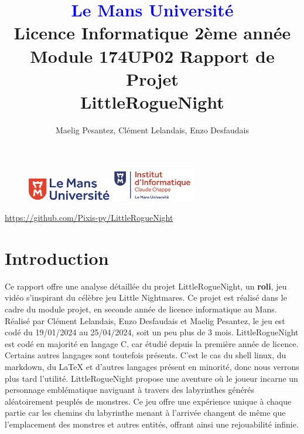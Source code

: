 \documentclass[10pt]{article}
\begin{document}
\begin{figure}
\includegraphics[width=3.7cm]{logolemansU.png}
\hspace{160pt}
\includegraphics[width=3.7cm]{logo_IC2.png}
\end{figure}

\title{\textbf{\textcolor{blue}{Le Mans Université}}\\Licence Informatique 2ème année\\Module 174UP02 Rapport de Projet\\\textbf{LittleRogueNight}}
\author{Maelig Pesantez, Clément Lelandais, Enzo Desfaudais}
\maketitle
\hspace{65pt}
\hyperlink{Github}{https://github.com/Pixis-py/LittleRogueNight}

\newpage
\tableofcontents

\newpage

\section{Introduction}
Ce rapport offre une analyse détaillée du projet LittleRogueNight, un \textbf{\gls{roli}}, jeu vidéo s'inspirant du célèbre jeu Little Nightmares. 
Ce projet est réalisé dans le cadre du module projet, en seconde année de licence informatique au Mans. Réalisé par Clément Lelandais, Enzo Desfaudais et Maelig Pesantez, le jeu est codé du 19/01/2024 au 25/04/2024, soit un peu plus de 3 mois.
LittleRogueNight est codé en majorité en langage C, car étudié depuis la première année de licence. Certains autres langages sont toutefois présents.
C'est le cas du shell linux, du markdown, du LaTeX et d'autres langages présent en minorité, donc nous verrons plus tard l'utilité.
LittleRogueNight propose une aventure où le joueur incarne un personnage emblématique naviguant à travers des labyrinthes générés aléatoirement peuplés de monstres. 
Ce jeu offre une expérience unique à chaque partie car les chemins du labyrinthe menant à l'arrivée changent de même que l'emplacement des monstres et autres entités, offrant ainsi une rejouabilité infinie.\\
\end{document}
